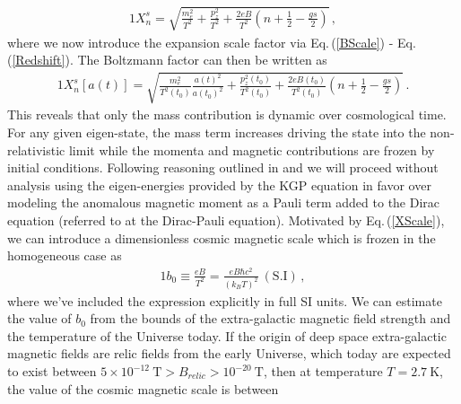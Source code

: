 \documentclass[universe,article,submit,moreauthors,pdftex,a4paper]{Definitions/mdpi}
\newcommand{\req}[1]{Eq.\,(\ref{#1})}
\begin{document}
\begin{alignat}{1}
    \label{XExplicit} X_{n}^{s} = \sqrt{\frac{m_{e}^{2}}{T^{2}}+\frac{p_{z}^{2}}{T^{2}}+\frac{2eB}{T^{2}}\left(n+\frac{1}{2}-\frac{gs}{2}\right)}\,,
\end{alignat}
where we now introduce the expansion scale factor via \req{BScale} - \req{Redshift}. The Boltzmann factor can then be written as
\begin{alignat}{1}
    \label{XScale} X_{n}^{s}[a(t)] = \sqrt{\frac{m_{e}^{2}}{T^{2}(t_{0})}\frac{a(t)^{2}}{a(t_{0})^{2}}+\frac{p_{z}^{2}(t_{0})}{T^{2}(t_{0})}+\frac{2eB(t_{0})}{T^{2}(t_{0})}\left(n+\frac{1}{2}-\frac{gs}{2}\right)}\,.
\end{alignat}
This reveals that only the mass contribution is dynamic over cosmological time. For any given eigen-state, the mass term increases driving the state into the non-relativistic limit while the momenta and magnetic contributions are frozen by initial conditions.
Following reasoning outlined in \cite{rafelski2023study} and \cite{Steinmetz:2018ryf} we will proceed without analysis using the eigen-energies provided by the KGP equation in favor over modeling the anomalous magnetic moment as a Pauli term added to the Dirac equation (referred to at the Dirac-Pauli equation). Motivated by \req{XScale}, we can introduce a dimensionless cosmic magnetic scale which is frozen in the homogeneous case as
\begin{alignat}{1}
    \label{Bo} b_{0}\equiv\frac{eB}{T^{2}}=\frac{eB\hbar c^{2}}{(k_{B}T)^{2}}\ \mathrm{(S.I)}\,,
\end{alignat}
where we've included the expression explicitly in full SI units. We can estimate the value of $b_{0}$ from the bounds of the extra-galactic magnetic field strength and the temperature of the Universe today.  If the origin of deep space extra-galactic magnetic fields are relic fields from the early Universe, which today are expected to exist between $5\times10^{-12}\ \mathrm{T}>B_{relic}>10^{-20}\ \mathrm{T}$, then at temperature $T=2.7\ \mathrm{K}$, the value of the cosmic magnetic scale is between
\end{document}
